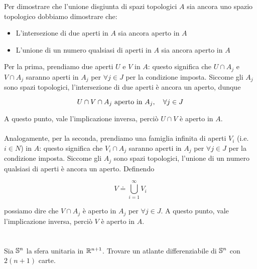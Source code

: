 Per dimostrare che l'unione disgiunta di spazi topologici $ A $ sia ancora uno spazio topologico dobbiamo dimostrare che:

\begin{itemize}
	\item L'intersezione di due aperti in $ A $ sia ancora aperto in $ A $
	
	\item L'unione di un numero qualsiasi di aperti in $ A $ sia ancora aperto in $ A $
\end{itemize}

Per la prima, prendiamo due aperti $ U $ e $ V $ in $ A $: questo significa che $ U \cap A_{j} $ e $ V \cap A_{j} $ saranno aperti in $ A_{j} $ per $ \forall j \in J $ per la condizione imposta. Siccome gli $ A_{j} $ sono spazi topologici, l'intersezione di due aperti è ancora un aperto, dunque

\begin{equation}
	U \cap V \cap A_{j} \text{ aperto in } A_{j} \qcomma \forall j \in J
\end{equation}

A questo punto, vale l'implicazione inversa, perciò $ U \cap V $ è aperto in $ A $.\\\\
Analogamente, per la seconda, prendiamo una famiglia infinita di aperti $ V_{i} $ (i.e. $ i \in N $) in $ A $: questo significa che $ V_{i} \cap A_{j} $ saranno aperti in $ A_{j} $ per $ \forall j \in J $ per la condizione imposta. Siccome gli $ A_{j} $ sono spazi topologici, l'unione di un numero qualsiasi di aperti è ancora un aperto. Definendo

\begin{equation}
	V \doteq \bigcup_{i=1}^{\infty} V_{i}
\end{equation}

possiamo dire che $ V \cap A_{j} $ è aperto in $ A_{j} $ per $ \forall j \in J $. A questo punto, vale l'implicazione inversa, perciò $ V $ è aperto in $ A $.

\section{}\label{es2-1}

\begin{tcolorbox}
	Sia $ \S^{n} $ la sfera unitaria in $ \R^{n+1} $. Trovare un atlante differenziabile di $ \S^{n} $ con $ 2(n+1) $ carte.
\end{tcolorbox}

